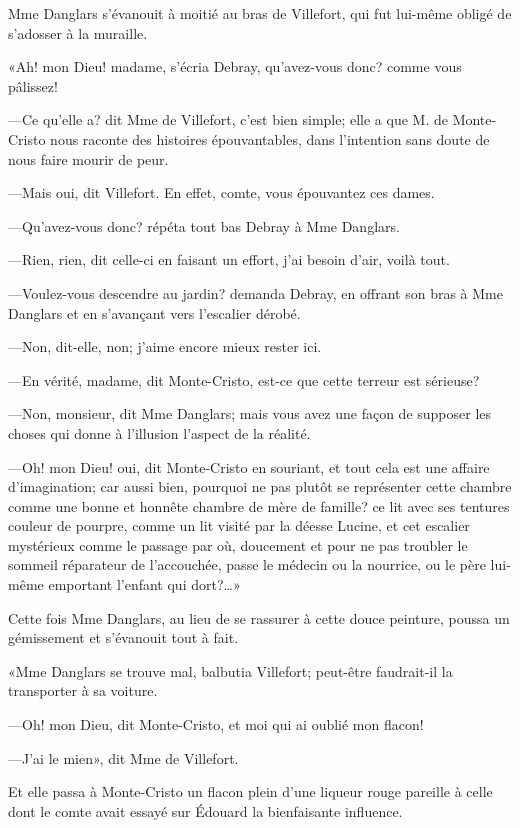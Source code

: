 Mme Danglars s'évanouit à moitié au bras de Villefort, qui fut lui-même obligé de s'adosser à la muraille. 

«Ah! mon Dieu! madame, s'écria Debray, qu'avez-vous donc? comme vous pâlissez! 

—Ce qu'elle a? dit Mme de Villefort, c'est bien simple; elle a que M. de Monte-Cristo nous raconte des histoires épouvantables, dans l'intention sans doute de nous faire mourir de peur. 

—Mais oui, dit Villefort. En effet, comte, vous épouvantez ces dames. 

—Qu'avez-vous donc? répéta tout bas Debray à Mme Danglars. 

—Rien, rien, dit celle-ci en faisant un effort, j'ai besoin d'air, voilà tout. 

—Voulez-vous descendre au jardin? demanda Debray, en offrant son bras à Mme Danglars et en s'avançant vers l'escalier dérobé. 

—Non, dit-elle, non; j'aime encore mieux rester ici. 

—En vérité, madame, dit Monte-Cristo, est-ce que cette terreur est sérieuse? 

—Non, monsieur, dit Mme Danglars; mais vous avez une façon de supposer les choses qui donne à l'illusion l'aspect de la réalité. 

—Oh! mon Dieu! oui, dit Monte-Cristo en souriant, et tout cela est une affaire d'imagination; car aussi bien, pourquoi ne pas plutôt se représenter cette chambre comme une bonne et honnête chambre de mère de famille? ce lit avec ses tentures couleur de pourpre, comme un lit visité par la déesse Lucine, et cet escalier mystérieux comme le passage par où, doucement et pour ne pas troubler le sommeil réparateur de l'accouchée, passe le médecin ou la nourrice, ou le père lui-même emportant l'enfant qui dort?\dots» 

Cette fois Mme Danglars, au lieu de se rassurer à cette douce peinture, poussa un gémissement et s'évanouit tout à fait. 

«Mme Danglars se trouve mal, balbutia Villefort; peut-être faudrait-il la transporter à sa voiture. 

—Oh! mon Dieu, dit Monte-Cristo, et moi qui ai oublié mon flacon!  

—J'ai le mien», dit Mme de Villefort. 

Et elle passa à Monte-Cristo un flacon plein d'une liqueur rouge pareille à celle dont le comte avait essayé sur Édouard la bienfaisante influence. 

